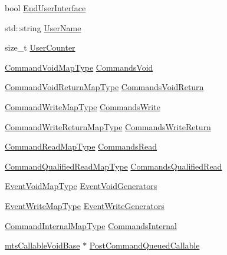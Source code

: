 \begin{DoxyCompactItemize}
\item 
bool \hyperlink{classmts_interface_provided_a928ec16cac3e49dfbddb294032fd3ab3}{End\-User\-Interface}
\item 
std\-::string \hyperlink{classmts_interface_provided_a37bb4e89240cb1056a013d9aa9b1d2aa}{User\-Name}
\item 
size\-\_\-t \hyperlink{classmts_interface_provided_a6a475bd79ec48c9db26b25c7d4e0a40f}{User\-Counter}
\item 
\hyperlink{classmts_interface_provided_af8414fb168541e531244967e0cc1afd2}{Command\-Void\-Map\-Type} \hyperlink{classmts_interface_provided_af1685c84fa379fffebf06605e1008251}{Commands\-Void}
\item 
\hyperlink{classmts_interface_provided_a963eeb4ba8e38411de4d40f983d5b4b3}{Command\-Void\-Return\-Map\-Type} \hyperlink{classmts_interface_provided_a650fc2d4d2b1350deeed706e6c2cd2de}{Commands\-Void\-Return}
\item 
\hyperlink{classmts_interface_provided_ad6809b9c0d16a2eb490429e6adace990}{Command\-Write\-Map\-Type} \hyperlink{classmts_interface_provided_a02f4ee724a9f03a524bfede2dd903a8e}{Commands\-Write}
\item 
\hyperlink{classmts_interface_provided_aaf1b5a70c029bb3c3bc2280ae1513c01}{Command\-Write\-Return\-Map\-Type} \hyperlink{classmts_interface_provided_af9df90920897bc835cfd86618023f025}{Commands\-Write\-Return}
\item 
\hyperlink{classmts_interface_provided_ab6a636c8cfda921a078ae1df8d90e087}{Command\-Read\-Map\-Type} \hyperlink{classmts_interface_provided_a91c9d2f72628533c2c6f88dcbcc8945c}{Commands\-Read}
\item 
\hyperlink{classmts_interface_provided_a08e212add6d96324bf5e029d09349a04}{Command\-Qualified\-Read\-Map\-Type} \hyperlink{classmts_interface_provided_ae67e71a6973cd2a190508e613e9cdb0c}{Commands\-Qualified\-Read}
\item 
\hyperlink{classmts_interface_provided_a81dc5f40eef8155cfc0ddad74c5c1b6a}{Event\-Void\-Map\-Type} \hyperlink{classmts_interface_provided_aebc0386db6c9bca51fc1c5e09dd6dfaf}{Event\-Void\-Generators}
\item 
\hyperlink{classmts_interface_provided_a98f1388a3c2119a1ae97f19302eeb550}{Event\-Write\-Map\-Type} \hyperlink{classmts_interface_provided_af12999317bfed03aa5b8a339f5624c97}{Event\-Write\-Generators}
\item 
\hyperlink{classmts_interface_provided_afbea756c205cd50db2a0884681ad650a}{Command\-Internal\-Map\-Type} \hyperlink{classmts_interface_provided_ad0aa42200e6d536f38ac743ae0a45767}{Commands\-Internal}
\item 
\hyperlink{classmts_callable_void_base}{mts\-Callable\-Void\-Base} $\ast$ \hyperlink{classmts_interface_provided_af7e4e42c17eea4b0a71fa7650a34a120}{Post\-Command\-Queued\-Callable}
\end{DoxyCompactItemize}
